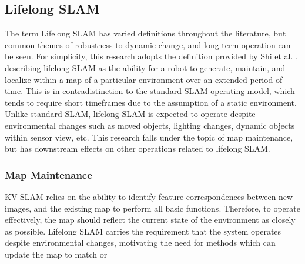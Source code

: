 \subsection{Lifelong SLAM}

The term Lifelong SLAM has varied definitions throughout the literature, but common themes of robustness to dynamic change, and long-term operation can be seen. For simplicity, this research adopts the definition provided by Shi et al. \cite{shiAreWeReady2020}, describing lifelong SLAM as the ability for a robot to generate, maintain, and localize within a map of a particular environment over an extended period of time. This is in contradistinction to the standard SLAM operating model, which tends to require short timeframes due to the assumption of a static environment. Unlike standard SLAM, lifelong SLAM is expected to operate despite environmental changes such as moved objects, lighting changes, dynamic objects within sensor view, etc. This research falls under the topic of map maintenance, but has downstream effects on other operations related to lifelong SLAM.

\subsubsection{Map Maintenance}

KV-SLAM relies on the ability to identify feature correspondences between new images, and the existing map to perform all basic functions. Therefore, to operate effectively, the map should reflect the current state of the environment as closely as possible. Lifelong SLAM carries the requirement that the system operates despite environmental changes, motivating the need for methods which can update the map to match or 
